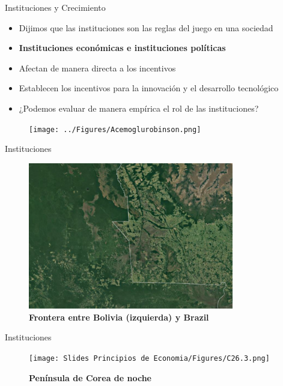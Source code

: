 \documentclass{beamer}
\begin{document}
\begin{frame}{Instituciones y Crecimiento}
    \begin{itemize}
        \item Dijimos que las instituciones son las reglas del juego en una sociedad
        \item \textbf{Instituciones económicas e instituciones políticas}
        \item Afectan de manera directa a los incentivos
        \item Establecen los incentivos para la innovación y el desarrollo tecnológico
        \item ¿Podemos evaluar de manera empírica el rol de las instituciones?
    \end{itemize}
    
    \begin{figure}[H]
        \texttt{[image: ../Figures/Acemoglurobinson.png]}
    \end{figure}
\end{frame}

\begin{frame}{Instituciones}
    
\begin{figure}[H]
\begin{center}
\includegraphics[width=0.8\textwidth]{Slides Principios de Economia/Figures/C26.2.png}
\end{center}
\caption{\textbf{Frontera entre Bolivia (izquierda) y Brazil}}
\label{fig:border_bol_bra}
\end{figure}
\end{frame}

\begin{frame}{Instituciones}
    \begin{figure}[H]
\begin{center}
\texttt{[image: Slides Principios de Economia/Figures/C26.3.png]}
\end{center}
\caption{\textbf{Península de Corea de noche}}
\label{fig:korea}
\end{figure}
\end{frame}
\end{document}
